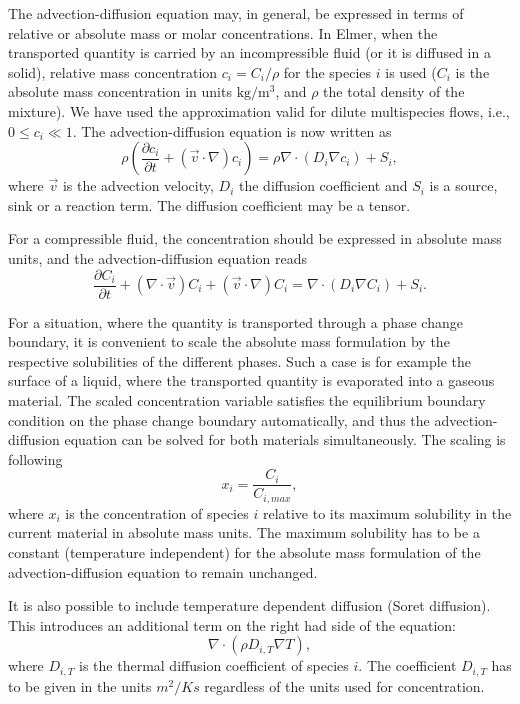 \begin{versiona}
The advection-diffusion equation may, in general, be expressed in
terms of relative or absolute mass or molar concentrations. In Elmer,
when the transported quantity is carried by an incompressible fluid
(or it is diffused in a solid), relative mass concentration
$c_i=C_i/\rho$ for the species $i$ is used ($C_i$ is the absolute mass
concentration in units $\mathrm{kg}/\mathrm{m}^3$, and $\rho$ the
total density of the mixture). We have used the approximation valid
for dilute multispecies flows, i.e., $0\le c_i\ll 1$.  The
advection-diffusion equation is now written as
\begin{equation}
\rho  \left( \frac{\partial c_i}{\partial t}+(\vec v\cdot\nabla) c_i\right) = 
\rho\nabla\cdot(D_i\nabla c_i) + S_i,
\end{equation}
where $\vec v$ is the advection velocity, $D_i$ the diffusion coefficient
and $S_i$ is a source, sink or a reaction term. The diffusion coefficient may
be a tensor.

For a compressible fluid, the concentration should be expressed in absolute
mass units, and the advection-diffusion equation reads
\begin{equation}
\frac{\partial C_i}{\partial t} + (\nabla\cdot\vec{v})C_i  +(\vec v\cdot\nabla) C_i = \nabla\cdot(D_i\nabla C_i) + S_i.
\end{equation}

For a situation, where the quantity is transported through a phase
change boundary, it is convenient to scale the absolute mass
formulation by the respective solubilities of the different
phases. Such a case is for example the surface of a liquid, where the
transported quantity is evaporated into a gaseous material. The
scaled concentration variable satisfies the equilibrium boundary 
condition on the phase
change boundary automatically, and thus the advection-diffusion
equation can be solved for both materials simultaneously. The scaling
is following
\begin{equation}
x_i = \frac{C_i}{C_{i,max}},
\end{equation}
where $x_i$ is the concentration of species $i$ relative to its
maximum solubility in the current material in absolute mass units. The
maximum solubility has to be a constant (temperature independent) for
the absolute mass formulation of the advection-diffusion equation to
remain unchanged.

It is also possible to include temperature dependent diffusion (Soret
diffusion). This introduces an additional term on the right had side
of the equation:
\begin{equation}
\nabla\cdot(\rho D_{i,T}\nabla T),
\end{equation}
where $D_{i,T}$ is the thermal diffusion coefficient of species
$i$. The coefficient $D_{i,T}$ has to be given in the units $m^2/Ks$
regardless of the units used for concentration.


\end{versiona}
